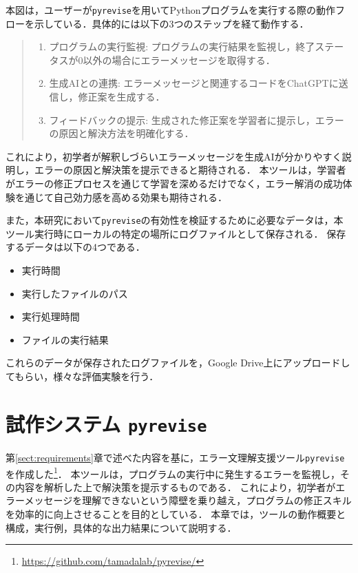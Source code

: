 \documentclass[12pt,twoside]{jbook}
\newcommand{\pyrevise}{\texttt{pyrevise}}
\begin{document}
本図は，ユーザーが\pyrevise を用いてPythonプログラムを実行する際の動作フローを示している．具体的には以下の3つのステップを経て動作する．

\begin{quote}
    \begin{enumerate}
	 \item プログラムの実行監視:
      プログラムの実行結果を監視し，終了ステータスが0以外の場合にエラーメッセージを取得する．
	 \item 生成AIとの連携:
	    エラーメッセージと関連するコードをChatGPTに送信し，修正案を生成する．
	 \item フィードバックの提示:
	    生成された修正案を学習者に提示し，エラーの原因と解決方法を明確化する．
    \end{enumerate}
\end{quote}

これにより，初学者が解釈しづらいエラーメッセージを生成AIが分かりやすく説明し，エラーの原因と解決策を提示できると期待される．
本ツールは，学習者がエラーの修正プロセスを通じて学習を深めるだけでなく，エラー解消の成功体験を通じて自己効力感を高める効果も期待される．

また，本研究において\pyrevise の有効性を検証するために必要なデータは，本ツール実行時にローカルの特定の場所にログファイルとして保存される．
保存するデータは以下の4つである．
\begin{itemize}
  \item 実行時間
  \item 実行したファイルのパス
  \item 実行処理時間
  \item ファイルの実行結果
\end{itemize}

これらのデータが保存されたログファイルを，Google Drive上にアップロードしてもらい，様々な評価実験を行う．


\chapter{試作システム \pyrevise}

第\ref{sect:requirements}章で述べた内容を基に，エラー文理解支援ツール\pyrevise を作成した\footnote{\url{https://github.com/tamadalab/pyrevise/}}．
本ツールは，プログラムの実行中に発生するエラーを監視し，その内容を解析した上で解決策を提示するものである．
これにより，初学者がエラーメッセージを理解できないという障壁を乗り越え，プログラムの修正スキルを効率的に向上させることを目的としている．
本章では，ツールの動作概要と構成，実行例，具体的な出力結果について説明する．
\end{document}
